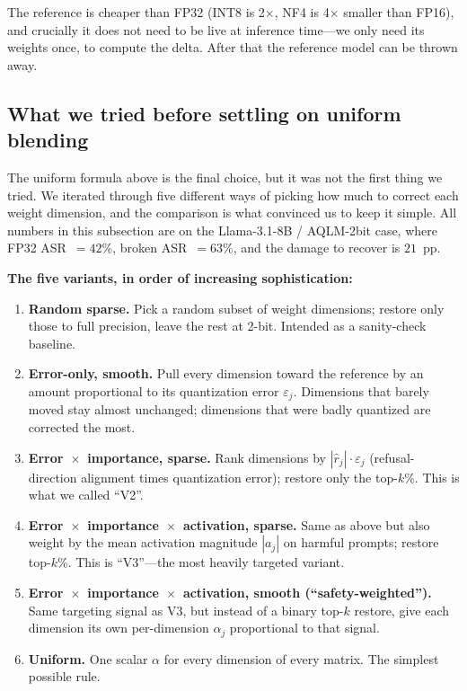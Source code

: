 \documentclass[11pt]{article}
\begin{document}
The reference is cheaper than FP32 (INT8 is 2$\times$, NF4 is 4$\times$ smaller than FP16), and crucially it does not need to be live at inference time---we only need its weights once, to compute the delta. After that the reference model can be thrown away.

\subsection{What we tried before settling on uniform blending}
\label{sec:ablation}

The uniform formula above is the final choice, but it was not the first thing we tried. We iterated through five different ways of picking how much to correct each weight dimension, and the comparison is what convinced us to keep it simple. All numbers in this subsection are on the Llama-3.1-8B / AQLM-2bit case, where FP32 ASR~$= 42$\%, broken ASR~$= 63$\%, and the damage to recover is $21$~pp.

\textbf{The five variants, in order of increasing sophistication:}
\begin{enumerate}
    \item \textbf{Random sparse.} Pick a random subset of weight dimensions; restore only those to full precision, leave the rest at 2-bit. Intended as a sanity-check baseline.
    \item \textbf{Error-only, smooth.} Pull every dimension toward the reference by an amount proportional to its quantization error $\varepsilon_j$. Dimensions that barely moved stay almost unchanged; dimensions that were badly quantized are corrected the most.
    \item \textbf{Error~$\times$~importance, sparse.} Rank dimensions by $|\hat{r}_j| \cdot \varepsilon_j$ (refusal-direction alignment times quantization error); restore only the top-$k$\%. This is what we called ``V2''.
    \item \textbf{Error~$\times$~importance~$\times$~activation, sparse.} Same as above but also weight by the mean activation magnitude $|a_j|$ on harmful prompts; restore top-$k$\%. This is ``V3''---the most heavily targeted variant.
    \item \textbf{Error~$\times$~importance~$\times$~activation, smooth (``safety-weighted'').} Same targeting signal as V3, but instead of a binary top-$k$ restore, give each dimension its own per-dimension $\alpha_j$ proportional to that signal.
    \item \textbf{Uniform.} One scalar $\alpha$ for every dimension of every matrix. The simplest possible rule.
\end{enumerate}
\end{document}
